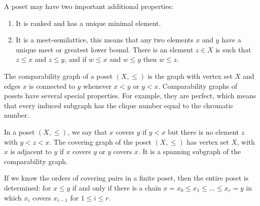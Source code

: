 \documentclass[11pt,twoside]{amsart}
\begin{document}
A poset may have two important additional properties:
\begin{enumerate}
\item\label{item(1)} It is ranked and has a unique minimal element.
\item\label{item(2)} It is a meet-semilattice, this means that any two elements $x$ and $y$ have a unique meet or greatest lower bound. There is an element $z\in X$ is such that $z\leq x$ and $z\leq y$, and if $w\leq x$ and $w\leq y$ then $w\leq z$.
\end{enumerate}
The comparability graph of a poset $(X,\leq)$ is the graph with vertex set $X$ and edges $x$ is connected to $y$ whenever $x<y$ or $y<x$. Comparability graphs of posets have several special properties. For example, they are perfect, which means that every induced subgraph has the clique number equal to the chromatic number. 

In a poset $(X,\leq)$, we say that $x$ covers $y$ if $y<x$ but there is no element $z$ with $y<z<x$. The covering graph of the poset $(X,\leq)$ has vertex set $X$, with $x$ is adjacent to $y$ if $x$ covers $y$ or $y$ covers $x$. It is a spanning subgraph of the comparability graph.

If we know the orders of covering pairs in a finite poset, then the entire poset is determined: for $x\leq y$ if and only if there is a chain
$x=x_0\leq x_1\leq\dots \leq x_r=y$
in which $x_i$ covers $x_{i-1}$ for $1\leq i\leq r$.
\end{document}
